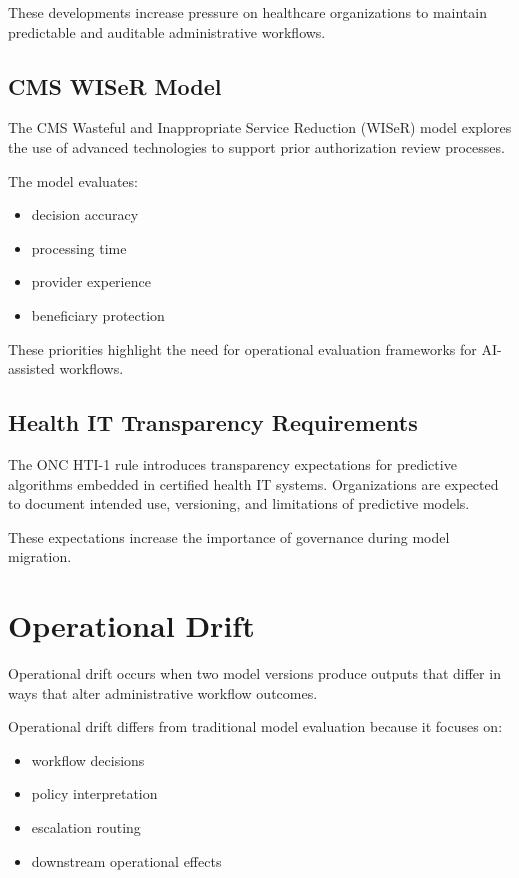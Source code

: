 \documentclass[11pt]{article}
\begin{document}
These developments increase pressure on healthcare organizations to maintain predictable and auditable administrative workflows.

\subsection{CMS WISeR Model}

The CMS Wasteful and Inappropriate Service Reduction (WISeR) model explores the use of advanced technologies to support prior authorization review processes.

The model evaluates:

\begin{itemize}
\item decision accuracy
\item processing time
\item provider experience
\item beneficiary protection
\end{itemize}

These priorities highlight the need for operational evaluation frameworks for AI-assisted workflows.

\subsection{Health IT Transparency Requirements}

The ONC HTI-1 rule introduces transparency expectations for predictive algorithms embedded in certified health IT systems. Organizations are expected to document intended use, versioning, and limitations of predictive models.

These expectations increase the importance of governance during model migration.

\section{Operational Drift}

Operational drift occurs when two model versions produce outputs that differ in ways that alter administrative workflow outcomes.

Operational drift differs from traditional model evaluation because it focuses on:

\begin{itemize}
\item workflow decisions
\item policy interpretation
\item escalation routing
\item downstream operational effects
\end{itemize}
\end{document}
